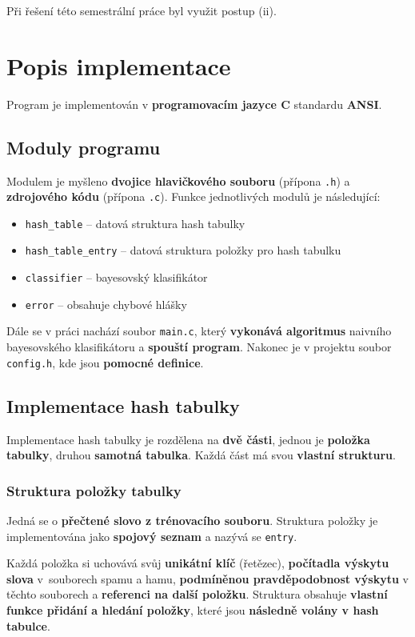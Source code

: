 \documentclass[12pt]{report}
\begin{document}
	Při řešení této semestrální práce byl využit postup (ii).
	
	\chapter{Popis implementace}
	Program je implementován v \textbf{programovacím jazyce C} standardu \textbf{ANSI}.
 	
 	\section{Moduly programu}
 	Modulem je myšleno \textbf{dvojice hlavičkového souboru} (přípona \texttt{.h}) a \textbf{zdrojového kódu} (přípona \texttt{.c}). Funkce jednotlivých modulů je následující:
 	
 	\begin{itemize}
 		\item \texttt{hash\_table} – datová struktura hash tabulky
 		\item \texttt{hash\_table\_entry} – datová struktura položky pro hash tabulku
 		\item \texttt{classifier} – bayesovský klasifikátor
 		\item \texttt{error} – obsahuje chybové hlášky
 	\end{itemize}
 
 	Dále se v práci nachází soubor \texttt{main.c}, který \textbf{vykonává algoritmus} naivního bayesovského klasifikátoru a \textbf{spouští program}. Nakonec je v projektu soubor \texttt{config.h}, kde jsou \textbf{pomocné definice}. 
 	
 	\section{Implementace hash tabulky}
    Implementace hash tabulky je rozdělena na \textbf{dvě části}, jednou je \textbf{položka tabulky}, druhou \textbf{samotná tabulka}. Každá část má svou \textbf{vlastní strukturu}.
 	
 	 	\subsection{Struktura položky tabulky}
 		Jedná se o \textbf{přečtené slovo z trénovacího souboru}. Struktura položky je implementována jako \textbf{spojový seznam} a nazývá se \texttt{entry}.
 		
 		Každá položka si uchovává svůj \textbf{unikátní klíč} (řetězec), \textbf{počítadla výskytu slova} v~souborech spamu a hamu, \textbf{podmíněnou pravděpodobnost výskytu} v těchto souborech a \textbf{referenci na další položku}. Struktura obsahuje \textbf{vlastní funkce přidání a hledání položky}, které jsou \textbf{následně volány v hash tabulce}.
 		
\end{document}

